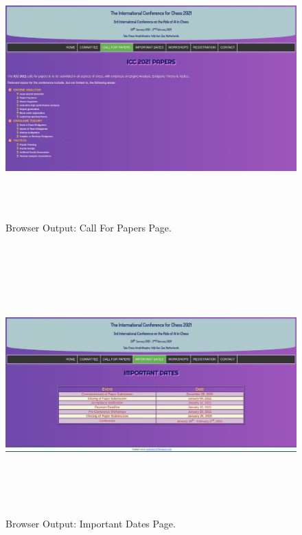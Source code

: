 \documentclass[12pt, a4]{article}
\begin{document}
\newpage
\subsection*{}
\begin{figure}[h]
\centering
\caption{Browser Output: Call For Papers Page.}
\includegraphics[height=10cm, width=18cm, keepaspectratio]{Output/Papers.png}
\end{figure}

\newpage
\subsection*{}
\begin{figure}[h]
\centering
\caption{Browser Output: Important Dates Page.}
\includegraphics[height=10cm, width=18cm, keepaspectratio]{Output/Dates.png}
\end{figure}
\end{document}
